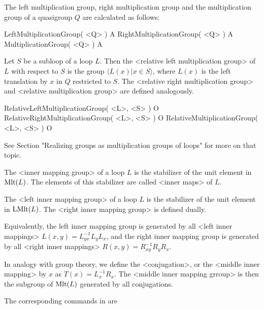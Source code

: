
The left multiplication group, right multiplication group and the
multiplication group of a quasigroup $Q$ are calculated as follows:

\>LeftMultiplicationGroup( <Q> ) A
\>RightMultiplicationGroup( <Q> ) A
\>MultiplicationGroup( <Q> ) A

Let $S$ be a subloop of a loop $L$. Then the <relative left multiplication
group> of $L$ with respect to $S$ is
the group $\langle L(x)|x\in S\rangle$, where $L(x)$ is the left translation by
$x$ in $Q$ restricted to $S$. The <relative right multiplication
group> and <relative multiplication
group>  are defined analogously.

\>RelativeLeftMultiplicationGroup( <L>, <S> ) O
\>RelativeRightMultiplicationGroup( <L>, <S> ) O
\>RelativeMultiplicationGroup( <L>, <S> ) O

See Section "Realizing groups as multiplication groups of loops" for more on
that topic.


The <inner mapping group> of a loop $L$ is the
stabilizer of the unit element in ${\rm{Mlt}}(L)$. The elements of this
stabilizer are called <inner maps> of $L$.

The <left inner mapping group> of a loop $L$ is
the stabilizer of the unit element in ${\rm{LMlt}}(L)$. The <right inner
mapping group> is defined dually.

Equivalently, the left inner mapping group is generated by all <left inner
mappings> $L(x,y) = L_{yx}^{-1}L_yL_x$, and the right
inner mapping group is generated by all <right inner mappings> $R(x,y) = R_{xy}^{-1}R_yR_x$.

In analogy with group theory, we define the <conjugation>,
or the <middle inner mapping> by $x$ as $T(x) =
L_x^{-1}R_x$. The <middle inner mapping grroup> is then the subgroup of ${\rm{Mlt}}(L)$ generated by all
conjugations.

The corresponding commands in {\LOOPS} are

